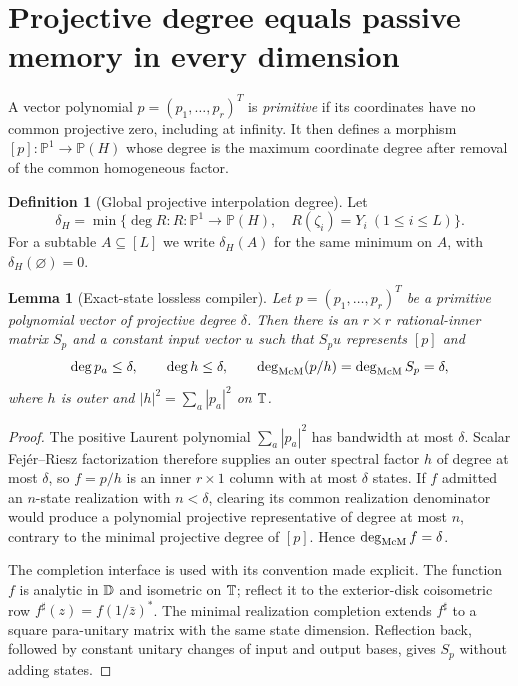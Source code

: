 \documentclass[11pt]{article}
\newtheorem{lemma}[theorem]{Lemma}
\theoremstyle{definition}\newtheorem{definition}[theorem]{Definition}\newtheorem{example}[theorem]{Example}
\theoremstyle{remark}\newtheorem{remark}[theorem]{Remark}\newtheorem{limitation}[theorem]{Limitation}
\newcommand{\PP}{\mathbb P}\newcommand{\rank}{\operatorname{rank}}
\begin{document}
\section{Projective degree equals passive memory in every dimension}

A vector polynomial $p=(p_1,\ldots,p_r)^T$ is \emph{primitive} if its
coordinates have no common projective zero, including at infinity.  It then
defines a morphism $[p]:\PP^1\to\PP(H)$ whose degree is the maximum coordinate
degree after removal of the common homogeneous factor.

\begin{definition}[Global projective interpolation degree]\label{def:global-delta}
Let
\[
 \delta_H=\min\{\deg R:R:\PP^1\to\PP(H),\quad
                         R(\zeta_i)=Y_i\ (1\le i\le L)\}.
\]
For a subtable $A\subseteq[L]$ we write $\delta_H(A)$ for the same minimum on
$A$, with $\delta_H(\varnothing)=0$.
\end{definition}

\begin{lemma}[Exact-state lossless compiler]\label{lem:lossless-compiler}
Let $p=(p_1,\ldots,p_r)^T$ be a primitive polynomial vector of projective
degree $\delta$.  Then there is an $r\times r$ rational-inner matrix $S_p$ and
a constant input vector $u$ such that $S_pu$ represents $[p]$ and
\[
 \deg p_a\le\delta,\qquad \deg h\le\delta,\qquad
 \deg_{\mathrm{McM}}(p/h)=\deg_{\mathrm{McM}} S_p=\delta,
\]
where $h$ is outer and $|h|^2=\sum_a|p_a|^2$ on $\mathbb T$.
\end{lemma}

\begin{proof}
The positive Laurent polynomial $\sum_a|p_a|^2$ has bandwidth at most
$\delta$.  Scalar Fej\'er--Riesz factorization therefore supplies an outer
spectral factor $h$ of degree at most $\delta$, so $f=p/h$ is an inner
$r\times1$ column with at most $\delta$ states.  If $f$ admitted an $n$-state
realization with $n<\delta$, clearing its common realization denominator would
produce a polynomial projective representative of degree at most $n$, contrary
to the minimal projective degree of $[p]$.  Hence $\deg_{\mathrm{McM}} f=\delta$.

The completion interface is used with its convention made explicit.  The
function $f$ is analytic in $\mathbb D$ and isometric on $\mathbb T$; reflect it to the
exterior-disk coisometric row
$f^\sharp(z)=f(1/\bar z)^*$.  The minimal realization completion
\cite[Theorem~2.1(ii)]{AlpayJorgensenLewkowicz2016} extends $f^\sharp$ to a
square para-unitary matrix with the same state dimension.  Reflection back,
followed by constant unitary changes of input and output bases, gives $S_p$
without adding states.
\end{proof}
\end{document}
